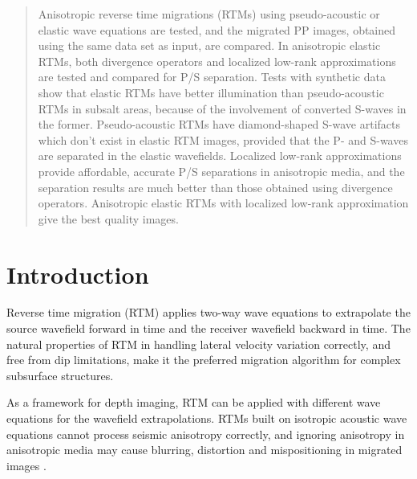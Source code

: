 \documentclass[manuscript,ulem,graphix,revised]{geophysics}
\begin{document}
\begin{abstract}
\indent\indent
Anisotropic reverse time migrations (RTMs) using pseudo-acoustic or elastic wave equations are tested, and the migrated PP images, obtained using the same data set as input, are compared. 
In anisotropic elastic RTMs, both divergence operators and localized low-rank approximations are tested and compared for P/S separation.
Tests with synthetic data show that elastic RTMs have better illumination than pseudo-acoustic RTMs in subsalt areas, because of the involvement of converted S-waves in the former. Pseudo-acoustic RTMs have diamond-shaped S-wave artifacts which don't exist in elastic RTM images, provided that the P- and S-waves are separated in the elastic wavefields. 
Localized low-rank approximations provide affordable, accurate P/S separations in anisotropic media, and the separation results are much better than those obtained using divergence operators.
Anisotropic elastic RTMs with localized low-rank approximation give the best quality images.

\end{abstract}

\section{Introduction}
\indent\indent
Reverse time migration (RTM) \citep{mcmechan83, whitmore83,baysal83} applies two-way wave equations to extrapolate the source wavefield forward in time and the receiver wavefield backward in time. The natural properties of RTM in handling lateral velocity variation correctly, and free from dip limitations, make it the preferred migration algorithm for complex subsurface structures.

As a framework for depth imaging, RTM can be applied with different wave equations for the wavefield extrapolations. RTMs built on isotropic acoustic wave equations cannot process seismic anisotropy correctly, and ignoring anisotropy in anisotropic media may cause blurring, distortion and mispositioning in migrated images \citep{huang09}. 
\end{document}
